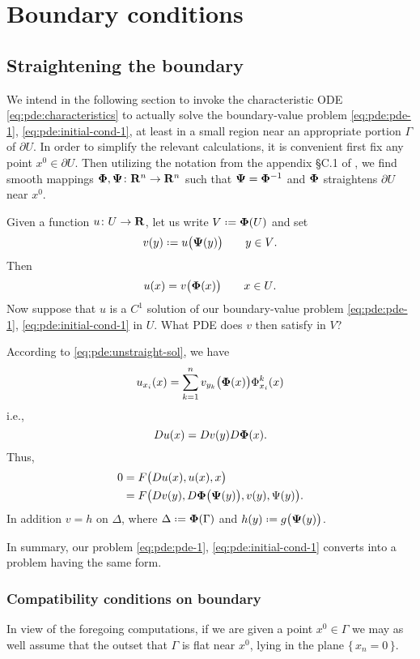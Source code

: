 \section{Boundary conditions}
\subsection{Straightening the boundary}
We intend in the following section to invoke the characteristic ODE
\eqref{eq:pde:characteristics} to actually solve the boundary-value problem
\eqref{eq:pde:pde-1}, \eqref{eq:pde:initial-cond-1}, at least in a small
region near an appropriate portion \(\Gamma\) of \(\partial U\). In order
to simplify the relevant calculations, it is convenient first fix any point
\(x^0\in\partial U\). Then utilizing the notation from the appendix \S C.1
of \cite{evans}, we find smooth mappings
\({\bm\Phi},{\bm\Psi}\colon\mathbf{R}^n\to\mathbf{R}^n\) such that \({\bm\Psi}={\bm\Phi}^{-1}\) and
\({\bm\Phi}\) straightens \(\partial U\) near \(x^0\).

Given a function \(u\colon U\to\mathbf{R}\), let us write \(V\defeq\bfPhi(U)\)
and set
\begin{equation}
  \label{eq:pde:straight-sol}
  v(y)\defeq u\bigl( \bfPsi(y) \bigr)\qquad\text{\(y\in V\).}
\end{equation}
Then
\begin{equation}
  \label{eq:pde:unstraight-sol}
  u(x)=v\bigl( {\bm\Phi}(x) \bigr)\qquad\text{\(x\in U\)}.
\end{equation}
Now suppose that \(u\) is a \(C^1\) solution of our boundary-value problem
\eqref{eq:pde:pde-1}, \eqref{eq:pde:initial-cond-1} in \(U\). What PDE does
\(v\) then satisfy in \(V\)?

According to \eqref{eq:pde:unstraight-sol}, we have
\[
  u_{x_i}(x)=\sum_{k=1}^n v_{y_k}\bigl( {\bm\Phi}(x) \bigr)\Phi_{x_i}^k(x)
\]
i.e.,
\[
  Du(x)=Dv(y)D{\bm\Phi}(x).
\]
Thus,
\begin{align*}
  0&=F\bigl(Du(x),u(x),x\bigr)\\
   &=F\bigl( Dv(y),D{\bm\Phi}\bigl({\bm\Psi}(y)\bigr),v(y),\Psi(y) \bigr).
\end{align*}
In addition \(v=h\) on \(\Delta\), where \(\Delta\defeq\bfPhi(\Gamma)\) and
\(h(y)\defeq g\bigl(\bfPsi(y)\bigr)\).

In summary, our problem \eqref{eq:pde:pde-1}, \eqref{eq:pde:initial-cond-1}
converts into a problem having the same form.

\subsubsection{Compatibility conditions on boundary}
In view of the foregoing computations, if we are given a point
\(x^0\in\Gamma\) we may as well assume that the outset that \(\Gamma\) is
flat near \(x^0\), lying in the plane \(\{\,x_n=0\,\}\).

